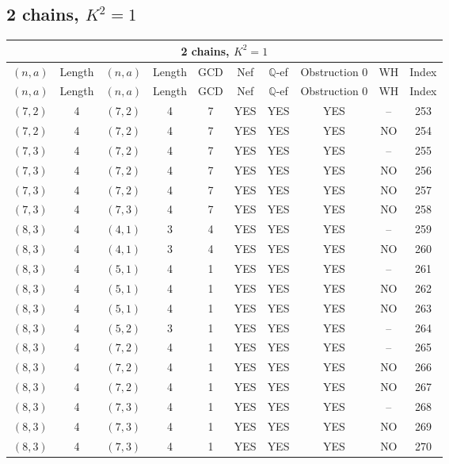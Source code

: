 \subsection{2 chains, $K^2 = 1$}
\begin{longtable}{|c|c|c|c|c|c|c|c|c|c|}
\hline
\multicolumn{10}{|c|}{2 chains, $K^2 = 1$}\\
\hline
$(n,a)$ & Length & $(n,a)$ & Length & GCD & Nef & $\mathbb Q$-ef & Obstruction 0 & WH & Index\\
\hline
\endfirsthead

\hline
$(n,a)$ & Length & $(n,a)$ & Length & GCD & Nef & $\mathbb Q$-ef & Obstruction 0 & WH & Index\\
\hline
\endhead
\hline
\endfoot

$(7, 2)$ & 4 & $(7, 2)$ & 4 & 7 & YES & YES & YES & -- & 253\\
$(7, 2)$ & 4 & $(7, 2)$ & 4 & 7 & YES & YES & YES & NO & 254\\
$(7, 3)$ & 4 & $(7, 2)$ & 4 & 7 & YES & YES & YES & -- & 255\\
$(7, 3)$ & 4 & $(7, 2)$ & 4 & 7 & YES & YES & YES & NO & 256\\
$(7, 3)$ & 4 & $(7, 2)$ & 4 & 7 & YES & YES & YES & NO & 257\\
$(7, 3)$ & 4 & $(7, 3)$ & 4 & 7 & YES & YES & YES & NO & 258\\
$(8, 3)$ & 4 & $(4, 1)$ & 3 & 4 & YES & YES & YES & -- & 259\\
$(8, 3)$ & 4 & $(4, 1)$ & 3 & 4 & YES & YES & YES & NO & 260\\
$(8, 3)$ & 4 & $(5, 1)$ & 4 & 1 & YES & YES & YES & -- & 261\\
$(8, 3)$ & 4 & $(5, 1)$ & 4 & 1 & YES & YES & YES & NO & 262\\
$(8, 3)$ & 4 & $(5, 1)$ & 4 & 1 & YES & YES & YES & NO & 263\\
$(8, 3)$ & 4 & $(5, 2)$ & 3 & 1 & YES & YES & YES & -- & 264\\
$(8, 3)$ & 4 & $(7, 2)$ & 4 & 1 & YES & YES & YES & -- & 265\\
$(8, 3)$ & 4 & $(7, 2)$ & 4 & 1 & YES & YES & YES & NO & 266\\
$(8, 3)$ & 4 & $(7, 2)$ & 4 & 1 & YES & YES & YES & NO & 267\\
$(8, 3)$ & 4 & $(7, 3)$ & 4 & 1 & YES & YES & YES & -- & 268\\
$(8, 3)$ & 4 & $(7, 3)$ & 4 & 1 & YES & YES & YES & NO & 269\\
$(8, 3)$ & 4 & $(7, 3)$ & 4 & 1 & YES & YES & YES & NO & 270\\

\end{longtable}
